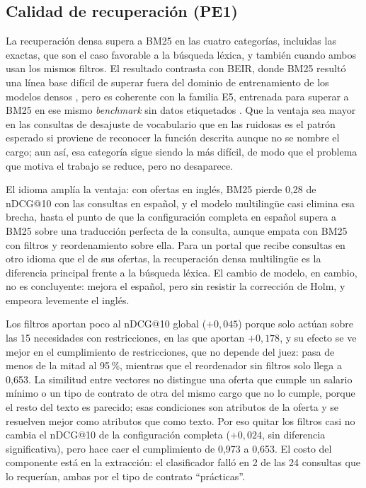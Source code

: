\subsection{Calidad de recuperación (PE1)}
\label{sec:disc-pe1}

La recuperación densa supera a BM25 en las cuatro categorías, incluidas las exactas, que son el caso favorable a la búsqueda léxica, y también cuando ambos usan los mismos filtros. El resultado contrasta con BEIR, donde BM25 resultó una línea base difícil de superar fuera del dominio de entrenamiento de los modelos densos \citep{Thakur2021}, pero es coherente con la familia E5, entrenada para superar a BM25 en ese mismo \textit{benchmark} sin datos etiquetados \citep{Wang2022E5}. Que la ventaja sea mayor en las consultas de desajuste de vocabulario que en las ruidosas es el patrón esperado si proviene de reconocer la función descrita aunque no se nombre el cargo; aun así, esa categoría sigue siendo la más difícil, de modo que el problema que motiva el trabajo se reduce, pero no desaparece.

El idioma amplía la ventaja: con ofertas en inglés, BM25 pierde 0,28 de nDCG@10 con las consultas en español, y el modelo multilingüe casi elimina esa brecha, hasta el punto de que la configuración completa en español supera a BM25 sobre una traducción perfecta de la consulta, aunque empata con BM25 con filtros y reordenamiento sobre ella. Para un portal que recibe consultas en otro idioma que el de sus ofertas, la recuperación densa multilingüe es la diferencia principal frente a la búsqueda léxica. El cambio de modelo, en cambio, no es concluyente: mejora el español, pero sin resistir la corrección de Holm, y empeora levemente el inglés.

Los filtros aportan poco al nDCG@10 global ($+0{,}045$) porque solo actúan sobre las 15 necesidades con restricciones, en las que aportan $+0{,}178$, y su efecto se ve mejor en el cumplimiento de restricciones, que no depende del juez: pasa de menos de la mitad al 95\,\%, mientras que el reordenador sin filtros solo llega a 0,653. La similitud entre vectores no distingue una oferta que cumple un salario mínimo o un tipo de contrato de otra del mismo cargo que no lo cumple, porque el resto del texto es parecido; esas condiciones son atributos de la oferta y se resuelven mejor como atributos que como texto. Por eso quitar los filtros casi no cambia el nDCG@10 de la configuración completa ($+0{,}024$, sin diferencia significativa), pero hace caer el cumplimiento de 0,973 a 0,653. El costo del componente está en la extracción: el clasificador falló en 2 de las 24 consultas que lo requerían, ambas por el tipo de contrato \enquote{prácticas}.


